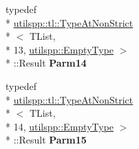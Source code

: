 \begin{DoxyCompactItemize}
\item 
\hypertarget{classutilspp_1_1Functor_a1cb28ac257f68e75e1bcdc6c63d23351}{typedef \\*
\hyperlink{structutilspp_1_1tl_1_1TypeAtNonStrict}{utilspp\-::tl\-::\-Type\-At\-Non\-Strict}\\*
$<$ T\-List, \\*
13, \hyperlink{structutilspp_1_1EmptyType}{utilspp\-::\-Empty\-Type} $>$\\*
\-::Result {\bfseries Parm14}}\label{classutilspp_1_1Functor_a1cb28ac257f68e75e1bcdc6c63d23351}

\item 
\hypertarget{classutilspp_1_1Functor_a33952917bb039e0ab723147a9611b57d}{typedef \\*
\hyperlink{structutilspp_1_1tl_1_1TypeAtNonStrict}{utilspp\-::tl\-::\-Type\-At\-Non\-Strict}\\*
$<$ T\-List, \\*
14, \hyperlink{structutilspp_1_1EmptyType}{utilspp\-::\-Empty\-Type} $>$\\*
\-::Result {\bfseries Parm15}}\label{classutilspp_1_1Functor_a33952917bb039e0ab723147a9611b57d}

\end{DoxyCompactItemize}
